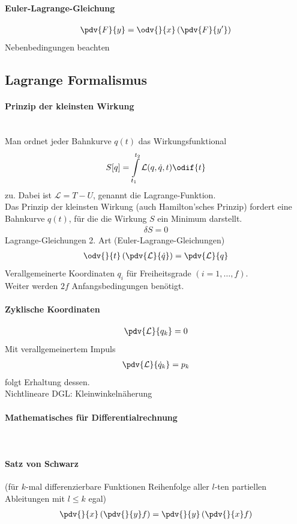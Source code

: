 \paragraph{Euler-Lagrange-Gleichung}
\begin{align*}
	\pdv{F}{y}=\odv{}{x}\left(\pdv{F}{y'}\right)
\end{align*}
Nebenbedingungen beachten
\subsection{Lagrange Formalismus}
\paragraph{Prinzip der kleinsten Wirkung}\ \\
Man ordnet jeder Bahnkurve $q(t)$ das Wirkungsfunktional
\begin{align*}
	S[q]=\int\limits_{t_1}^{t_2} \mathcal{L}(q,\dot{q},t)\odif{t}
\end{align*}
zu. Dabei ist $\mathcal{L}=T-U$, genannt die Lagrange-Funktion.\\
Das Prinzip der kleinsten Wirkung (auch Hamilton'sches Prinzip) fordert eine Bahnkurve $q(t)$, für die die Wirkung $S$ ein Minimum darstellt.
\begin{align*}
	\delta S = 0
\end{align*}
Lagrange-Gleichungen 2. Art (Euler-Lagrange-Gleichungen)
\begin{align*}
	\odv{}{t}\left(\pdv{\mathcal{L}}{\dot{q}}\right)=\pdv{\mathcal{L}}{q}
\end{align*}
Verallgemeinerte Koordinaten $q_i$ für Freiheitsgrade $(i=1,\dots,f)$.\\
Weiter werden $2f$ Anfangsbedingungen benötigt.
\paragraph{Zyklische Koordinaten}
\begin{align*}
	\pdv{\mathcal{L}}{q_k}=0\\
\end{align*}
Mit verallgemeinertem Impuls
\begin{align*}
	\pdv{\mathcal{L}}{\dot{q}_k}=p_k
\end{align*}
folgt Erhaltung dessen.\\
Nichtlineare DGL: Kleinwinkelnäherung

\paragraph{\Large Mathematisches für Differentialrechnung} \ \\
\paragraph{Satz von Schwarz} (für $k$-mal differenzierbare Funktionen Reihenfolge aller $l$-ten partiellen Ableitungen mit $l\leq k$ egal)
\begin{align*}
	\pdv{}{x}\left(\pdv{}{y}f\right)=\pdv{}{y}\left(\pdv{}{x}f\right)
\end{align*}
